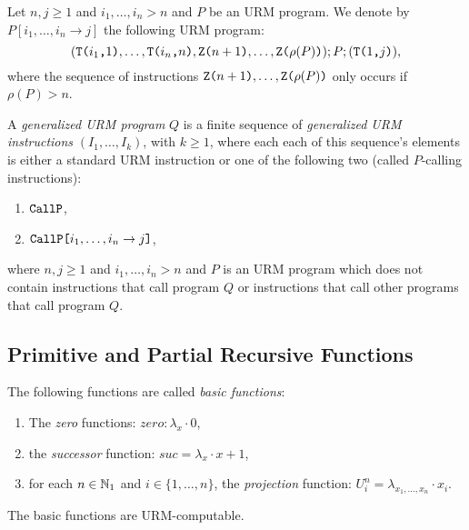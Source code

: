 \begin{definition}
	Let $n, j \geq 1$ and $i_1, \ldots, i_n > n$ and $P$ be an URM program. We denote by $P[i_1, \ldots, i_n \to j]$ the following URM program:
	\[
		(\texttt{T(} i_1 \texttt{,} 1 \texttt{)}, \ldots, \texttt{T(} i_n \texttt{,} n \texttt{)}, \texttt{Z(} n+1 \texttt{)}, \ldots, \texttt{Z(} \rho(P) \texttt{)}); P ; (\texttt{T(} 1 \texttt{,} j \texttt{)}),
	\]
	where the sequence of instructions $\texttt{Z(} n+1 \texttt{)}, \ldots, \texttt{Z(} \rho(P) \texttt{)}$ only occurs if $\rho(P) > n$.
\end{definition}

\begin{definition}
	A \emph{generalized URM program} $Q$ is a finite sequence of \emph{generalized URM instructions} $(I_1, \ldots, I_k)$, with $k \geq 1$, where each each of this sequence's elements is either a standard URM instruction or one of the following two (called $P$-calling instructions):
	\begin{enumerate}
		\item $\texttt{CallP}$,
		\item $\texttt{CallP[} i_1, \ldots, i_n \to j \texttt ]$,
	\end{enumerate}
	where $n,j \geq 1$ and $i_1, \ldots, i_n > n$ and $P$ is an URM program which does not contain instructions that call program $Q$ or instructions that call other programs that call program $Q$.
\end{definition}
\subsection{Primitive and Partial Recursive Functions}
\begin{definition}
	The following functions are called \emph{basic functions}:
	\begin{enumerate}
		\item The \emph{zero} functions: $zero : \lambda_x \cdot 0$,
		\item the \emph{successor} function: $suc = \lambda_x \cdot x + 1$,
		\item for each $n \in \mathbb{N}_1$ and $i \in \{ 1, \ldots, n \}$, the \emph{projection} function: $U_i^n = \lambda_{x_1, \ldots, x_n} \cdot x_i$.
	\end{enumerate}
\end{definition}

\begin{theorem}
	The basic functions are URM-computable.
\end{theorem}

